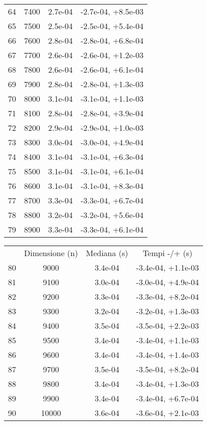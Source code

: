 \begin{table}
\begin{adjustbox}{width=1\textwidth/2}
\begin{tabular}{|c|c|c|c|}
\cline{1-4}
64 & 7400 & 2.7e-04 & -2.7e-04, +8.5e-03 \\
\cline{1-4}
65 & 7500 & 2.5e-04 & -2.5e-04, +5.4e-04 \\
\cline{1-4}
66 & 7600 & 2.8e-04 & -2.8e-04, +6.8e-04 \\
\cline{1-4}
67 & 7700 & 2.6e-04 & -2.6e-04, +1.2e-03 \\
\cline{1-4}
68 & 7800 & 2.6e-04 & -2.6e-04, +6.1e-04 \\
\cline{1-4}
69 & 7900 & 2.8e-04 & -2.8e-04, +1.3e-03 \\
\cline{1-4}
70 & 8000 & 3.1e-04 & -3.1e-04, +1.1e-03 \\
\cline{1-4}
71 & 8100 & 2.8e-04 & -2.8e-04, +3.9e-04 \\
\cline{1-4}
72 & 8200 & 2.9e-04 & -2.9e-04, +1.0e-03 \\
\cline{1-4}
73 & 8300 & 3.0e-04 & -3.0e-04, +4.9e-04 \\
\cline{1-4}
74 & 8400 & 3.1e-04 & -3.1e-04, +6.3e-04 \\
\cline{1-4}
75 & 8500 & 3.1e-04 & -3.1e-04, +6.1e-04 \\
\cline{1-4}
76 & 8600 & 3.1e-04 & -3.1e-04, +8.3e-04 \\
\cline{1-4}
77 & 8700 & 3.3e-04 & -3.3e-04, +6.7e-04 \\
\cline{1-4}
78 & 8800 & 3.2e-04 & -3.2e-04, +5.6e-04 \\
\cline{1-4}
79 & 8900 & 3.3e-04 & -3.3e-04, +6.1e-04 \\
\cline{1-4}
\end{tabular}
\end{adjustbox}
\end{table}

\begin{table}
\centering
\begin{adjustbox}{width=1\textwidth/2}
\begin{tabular}{|c|c|c|c|}
\hline
 & Dimensione (n) & Mediana (s) & Tempi -/+ (s) \\
80 & 9000 & 3.4e-04 & -3.4e-04, +1.1e-03 \\
\cline{1-4}
81 & 9100 & 3.0e-04 & -3.0e-04, +4.9e-04 \\
\cline{1-4}
82 & 9200 & 3.3e-04 & -3.3e-04, +8.2e-04 \\
\cline{1-4}
83 & 9300 & 3.2e-04 & -3.2e-04, +1.3e-03 \\
\cline{1-4}
84 & 9400 & 3.5e-04 & -3.5e-04, +2.2e-03 \\
\cline{1-4}
85 & 9500 & 3.4e-04 & -3.4e-04, +1.1e-03 \\
\cline{1-4}
86 & 9600 & 3.4e-04 & -3.4e-04, +1.4e-03 \\
\cline{1-4}
87 & 9700 & 3.5e-04 & -3.5e-04, +8.2e-04 \\
\cline{1-4}
88 & 9800 & 3.4e-04 & -3.4e-04, +1.3e-03 \\
\cline{1-4}
89 & 9900 & 3.4e-04 & -3.4e-04, +6.7e-04 \\
\cline{1-4}
90 & 10000 & 3.6e-04 & -3.6e-04, +2.1e-03 \\
\cline{1-4}
\end{tabular}
\end{adjustbox}
\end{table}

